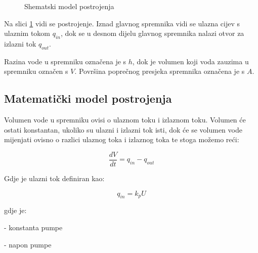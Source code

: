\begin{figure}[H]
\caption{Shematski model postrojenja}
\label{fig:plant}
\end{figure}

Na slici \ref{fig:plant} vidi se postrojenje. Iznad glavnog spremnika vidi se
ulazna cijev s ulaznim tokom $q_{in}$, dok se u desnom dijelu glavnog spremnika
nalazi otvor za izlazni tok $q_{out}$.

Razina vode u spremniku označena je s $h$, dok je volumen koji voda zauzima u
spremniku označen s $V$. Površina poprečnog presjeka spremnika označena je s
$A$.

\newpage
\subsection{Matematički model postrojenja}


Volumen vode u spremniku ovisi o ulaznom toku i izlaznom toku. Volumen će ostati
konstantan, ukoliko su ulazni i izlazni tok isti, dok će se volumen vode mijenjati
ovisno o razlici ulaznog toka i izlaznog toka te stoga možemo reći:

\begin{equation}
    \frac{dV}{dt} = q_{in} - q_{out}
\label{eq:first}
\end{equation}

Gdje je ulazni tok definiran kao:

\begin{equation} q_{in} = k_p U \end{equation}

gdje je:
\begin{description}[labelindent=2cm]
        \item[$k_p$] - konstanta pumpe
        \item[$U$]   - napon pumpe
\end{description}

